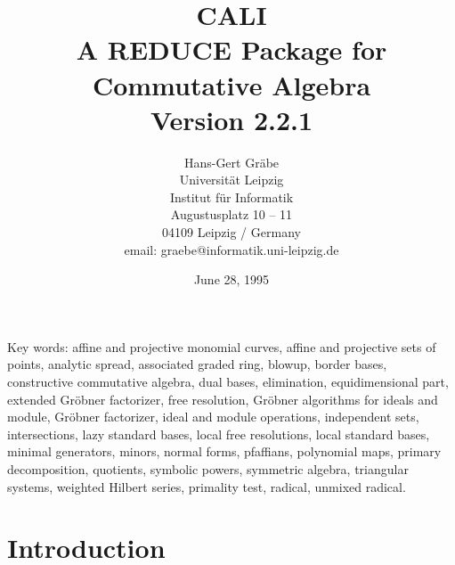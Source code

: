 
\date{June 28, 1995}

\textheight 21cm
\textwidth 15cm 
\voffset -60pt
\hoffset -45pt

\newcommand{\gr}{Gr\"obner }
\newcommand{\x}{{\bf x}}
\newcommand{\ind}[1]{{\em #1}\index{#1}}
\newcommand{\pbx}[1]{\mbox{}\hfill \parbox[t]{12cm}{#1} \pagebreak[3]}
\newcommand{\nl}{\newline \hspace*{5mm}}

\makeindex

\title{CALI\\[20pt] A REDUCE Package for \\ 
    Commutative Algebra \\Version 2.2.1}

\author{
Hans-Gert Gr\"abe \\[15pt]
Universit\"at Leipzig\\ 
Institut f\"ur Informatik \\
Augustusplatz 10 -- 11\\
04109 Leipzig / Germany\\[20pt]
email: graebe@informatik.uni-leipzig.de}



\maketitle

\vfill
Key words: 
affine and projective monomial curves,
affine and projective sets of points, 
analytic spread, 
associated graded ring, 
blowup,
border bases, 
constructive commutative algebra, 
dual bases, 
elimination,
equidimensional part, 
extended \gr factorizer, 
free resolution, 
\gr algorithms for ideals and module, 
\gr factorizer,
ideal and module operations, 
independent sets, 
intersections,
lazy standard bases,
local free resolutions,
local standard bases,
minimal generators,
minors,
normal forms, 
pfaffians,
polynomial maps,
primary decomposition, 
quotients,
symbolic powers,
symmetric algebra, 
triangular systems, 
weighted Hilbert series, 
primality test, 
radical,
unmixed radical.

\pagebreak

\tableofcontents

\pagebreak

\section{Introduction}

